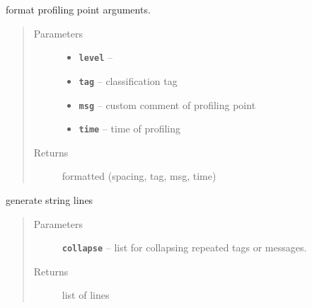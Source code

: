 \documentclass[letterpaper,10pt,english]{sphinxmanual}
\begin{document}
\begin{fulllineitems}

\begin{fulllineitems}
\label{RRtoolbox.lib:RRtoolbox.lib.root.profiler.formatter}
format profiling point arguments.
\begin{quote}\begin{description}
\item[{Parameters}] \leavevmode\begin{itemize}
\item {} 
\textbf{\texttt{level}} -- 

\item {} 
\textbf{\texttt{tag}} -- classification tag

\item {} 
\textbf{\texttt{msg}} -- custom comment of profiling point

\item {} 
\textbf{\texttt{time}} -- time of profiling

\end{itemize}

\item[{Returns}] \leavevmode
formatted (spacing, tag, msg, time)

\end{description}\end{quote}

\end{fulllineitems}


\begin{fulllineitems}
\label{RRtoolbox.lib:RRtoolbox.lib.root.profiler.lines_formatted}
generate string lines
\begin{quote}\begin{description}
\item[{Parameters}] \leavevmode
\textbf{\texttt{collapse}} -- list for collapsing repeated tags or messages.

\item[{Returns}] \leavevmode
list of lines

\end{description}\end{quote}

\end{fulllineitems}


\end{fulllineitems}
\end{document}
